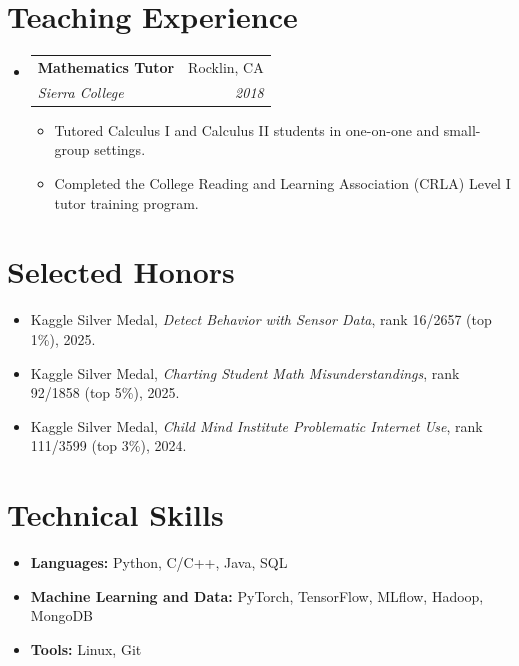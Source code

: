 \documentclass[letterpaper,10pt]{article}
\makeatletter
\newcommand{\resumeItem}[1]{
  \item \small{#1}
}
\newcommand{\resumeSubheading}[4]{
  \item
    \begin{tabular*}{0.97\textwidth}[t]{l@{\extracolsep{\fill}}r}
      \textbf{#1} & #2 \\
      \textit{\small #3} & \textit{\small #4} \\
    \end{tabular*}\vspace{-7pt}
}
\newcommand{\resumeSubHeadingListStart}{\begin{itemize}[leftmargin=0in, label={}]}
\newcommand{\resumeSubHeadingListEnd}{\end{itemize}}
\newcommand{\resumeItemListStart}{\begin{itemize}[leftmargin=0.18in, itemsep=2pt, topsep=2pt]}
\newcommand{\resumeItemListEnd}{\end{itemize}\vspace{-6pt}}
\makeatother
\begin{document}
\section{Teaching Experience}
\resumeSubHeadingListStart
  \resumeSubheading
    {Mathematics Tutor}{Rocklin, CA}
    {Sierra College}{2018}
  \resumeItemListStart
    \resumeItem{Tutored Calculus I and Calculus II students in one-on-one and small-group settings.}
    \resumeItem{Completed the College Reading and Learning Association (CRLA) Level I tutor training program.}
  \resumeItemListEnd
\resumeSubHeadingListEnd

\section{Selected Honors}
\begin{itemize}[leftmargin=0.15in, itemsep=4pt, topsep=2pt]
  \item \small{Kaggle Silver Medal, \emph{Detect Behavior with Sensor Data}, rank 16/2657 (top 1\%), 2025.}
  \item \small{Kaggle Silver Medal, \emph{Charting Student Math Misunderstandings}, rank 92/1858 (top 5\%), 2025.}
  \item \small{Kaggle Silver Medal, \emph{Child Mind Institute Problematic Internet Use}, rank 111/3599 (top 3\%), 2024.}
\end{itemize}

\section{Technical Skills}
\begin{itemize}[leftmargin=0.15in, itemsep=2pt, topsep=2pt]
  \item \small{\textbf{Languages:} Python, C/C++, Java, SQL}
  \item \small{\textbf{Machine Learning and Data:} PyTorch, TensorFlow, MLflow, Hadoop, MongoDB}
  \item \small{\textbf{Tools:} Linux, Git}
\end{itemize}
\end{document}
